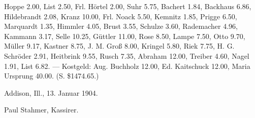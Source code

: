 Hoppe 2.00, List 2.50, Frl. Hörtel 2.00, Suhr 5.75, Bachert 1.84, Backhaus 6.86, Hildebrandt 2.08, Kranz 10.00, Frl. Noack 5.50, Kemnitz 1.85, Prigge 6.50, Marquardt 1.35, Himmler 4.05, Brust 3.55, Schulze 3.60, Rademacher 4.96, Kammann 3.17, Selle 10.25, Güttler 11.00, Rose 8.50, Lampe 7.50, Otto 9.70, Müller 9.17, Kastner 8.75, J. M. Groß 8.00, Kringel 5.80, Riek 7.75, H. G. Schröder 2.91, Heitbrink 9.55, Rusch 7.35, Abraham 12.00, Treiber 4.60, Nagel 1.91, List 6.82. — Kostgeld: Aug. Buchholz 12.00, Ed. Kaitschuck 12.00, Maria Ursprung 40.00. (S. \$1474.65.)

Addison, Ill., 13. Januar 1904.

Paul Stahmer, Kassirer.
